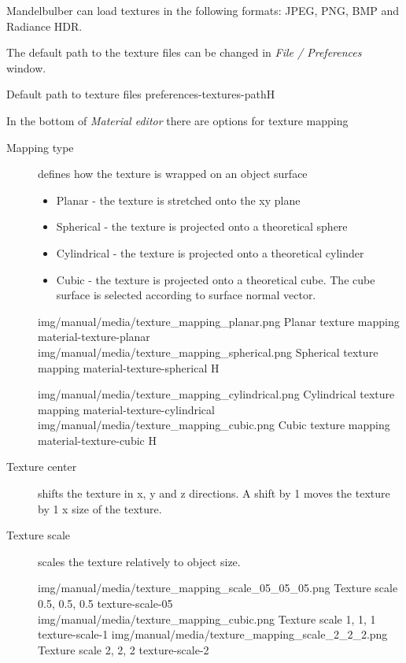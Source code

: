 Mandelbulber can load textures in the following formats: JPEG, PNG, BMP and Radiance HDR. 

The default path to the texture files can be changed in \emph{File / Preferences} window.

 {Default path to texture files}
 {preferences-textures-path}{H}
 
 In the bottom of \emph{Material editor} there are options for texture mapping
 
 \begin{description}
 	\item[Mapping type] defines how the texture is wrapped on an object surface
 	\begin{itemize}
 		\item Planar - the texture is stretched onto the xy plane
 		\item Spherical - the texture is projected onto a theoretical sphere
 		\item Cylindrical - the texture is projected onto a theoretical cylinder
 		\item Cubic - the texture is projected onto a theoretical cube. The cube surface is selected according to surface normal vector.
 	\end{itemize} 
 
	 \twoImagesWithTwoCaptionsFullWidth
	 {img/manual/media/texture_mapping_planar.png}
	 {Planar texture mapping}
	 {material-texture-planar}
	 {img/manual/media/texture_mapping_spherical.png}
	 {Spherical texture mapping}
	 {material-texture-spherical}
	 {H}
	 
	 \twoImagesWithTwoCaptionsFullWidth
	 {img/manual/media/texture_mapping_cylindrical.png}
	 {Cylindrical texture mapping}
	 {material-texture-cylindrical}
	 {img/manual/media/texture_mapping_cubic.png}
	 {Cubic texture mapping}
	 {material-texture-cubic}
	 {H}
	 
	 \item[Texture center] shifts the texture in x, y and z directions. A shift by 1 moves the texture by 1 x size of the texture.
	 
	 \item[Texture scale] scales the texture relatively to object size.
	 
	 \threeImagesWithTwoCaptionsFullWidth
	 {img/manual/media/texture_mapping_scale_05_05_05.png}
	 {Texture scale 0.5, 0.5, 0.5}
	 {texture-scale-05}
	 {img/manual/media/texture_mapping_cubic.png}
	 {Texture scale 1, 1, 1}
	 {texture-scale-1}
	 {img/manual/media/texture_mapping_scale_2_2_2.png}
	 {Texture scale 2, 2, 2}
	 {texture-scale-2}
	 

\end{description}
